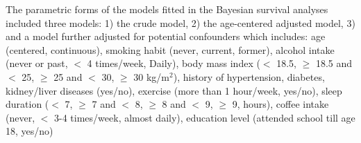 \documentclass[nutrients,article,submit,moreauthors,pdftex]{mdpi}
\begin{document}
The parametric forms of the models fitted in the Bayesian survival
analyses included three models: 1) the crude model, 2) the age-centered
adjusted model, 3) and a model further adjusted for potential
confounders which includes: age (centered, continuous), smoking habit
(never, current, former), alcohol intake (never or past, \(<\) 4
times/week, Daily), body mass index (\(<\) 18.5, \(\geq\) 18.5 and \(<\)
25, \(\geq\) 25 and \(<\) 30, \(\geq\) 30 kg/m\(^2\)), history of
hypertension, diabetes, kidney/liver diseases (yes/no), exercise (more
than 1 hour/week, yes/no), sleep duration (\(<\) 7, \(\geq\) 7 and \(<\)
8, \(\geq\) 8 and \(<\) 9, \(\geq\) 9, hours), coffee intake (never,
\(<\) 3-4 times/week, almost daily), education level (attended school
till age 18, yes/no)

\begin{table}[h]
\caption{\label{tab:tab1f}Sex-specific baseline characteristics according to the frequency of milk intake (JACC study, 1988-2009).}
\centering
\fontsize{8}{10}\selectfont
{}
\end{table}
\end{document}
